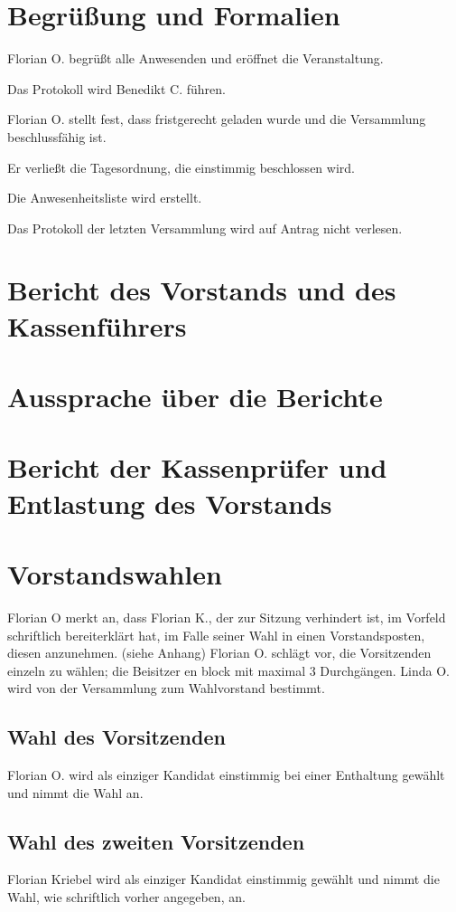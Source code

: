 \section{Begrüßung und Formalien}
Florian O. begrüßt alle Anwesenden und eröffnet die Veranstaltung. 

Das Protokoll wird Benedikt C. führen.

Florian O. stellt fest, dass fristgerecht geladen wurde und die Versammlung beschlussfähig ist. 

Er verließt die Tagesordnung, die einstimmig beschlossen wird.

Die Anwesenheitsliste wird erstellt.

Das Protokoll der letzten Versammlung wird auf Antrag nicht verlesen. 


\section{Bericht des Vorstands und des Kassenführers}


\section{Aussprache über die Berichte}
\section{Bericht der Kassenprüfer und Entlastung des Vorstands}

\section{Vorstandswahlen}
 Florian O merkt an, dass Florian K., der zur Sitzung verhindert ist, im Vorfeld schriftlich bereiterklärt hat, im Falle seiner Wahl in einen Vorstandsposten, diesen anzunehmen. (siehe Anhang)
 Florian O. schlägt vor, die Vorsitzenden einzeln zu wählen; die Beisitzer en block mit maximal 3 Durchgängen.
 Linda O. wird von der Versammlung zum Wahlvorstand bestimmt.
\subsection{Wahl des Vorsitzenden}
 Florian O. wird als einziger Kandidat einstimmig bei einer Enthaltung gewählt und nimmt die Wahl an. 
\subsection{Wahl des zweiten Vorsitzenden}         
 Florian Kriebel wird als einziger Kandidat einstimmig gewählt und nimmt die Wahl, wie schriftlich vorher angegeben, an. 
